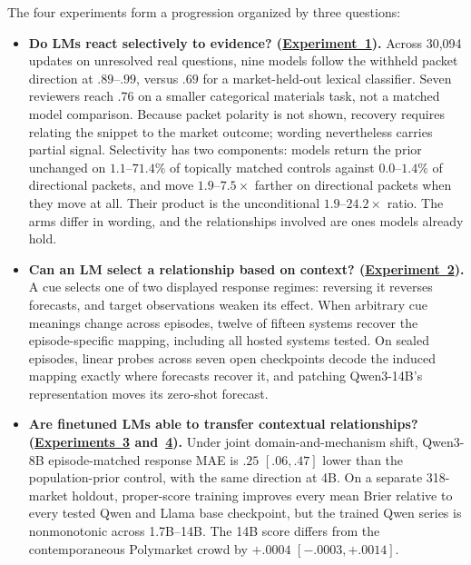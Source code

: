 The four experiments form a progression organized by three questions:
\begin{itemize}[nosep,leftmargin=*]
  \item \textbf{Do LMs react selectively to evidence?
  (\hyperref[sec:exp1]{Experiment~1}).}
  Across 30,094 updates on unresolved real questions, nine models follow the
  withheld packet direction at $.89$--$.99$, versus $.69$ for a market-held-out
  lexical classifier. Seven reviewers reach $.76$ on a smaller categorical
  materials task, not a matched model comparison. Because packet polarity is not
  shown, recovery requires relating the snippet to the market outcome; wording
  nevertheless carries partial signal. Selectivity has two components:
  models return
  the prior unchanged on $1.1$--$71.4\%$ of topically matched controls against
  $0.0$--$1.4\%$ of directional packets, and move $1.9$--$7.5\times$ farther on
  directional packets when they move at all. Their product is the unconditional
  $1.9$--$24.2\times$ ratio. The arms differ in wording, and the relationships
  involved are ones models already hold.
  \item \textbf{Can an LM select a relationship based on context?
  (\hyperref[sec:exp2]{Experiment~2}).}
  A cue selects one of two displayed response regimes: reversing it reverses
  forecasts, and target observations weaken its effect. When arbitrary cue meanings
  change across episodes, twelve of fifteen systems recover the episode-specific
  mapping, including all hosted systems tested. On sealed episodes, linear probes
  across seven open checkpoints decode the induced mapping exactly where forecasts
  recover it, and patching Qwen3-14B's representation moves its zero-shot forecast.
  \item \textbf{Are finetuned LMs able to transfer contextual relationships?
  (\hyperref[sec:exp3]{Experiments~3} and~\hyperref[sec:exp4]{4}).}
  Under joint domain-and-mechanism shift, Qwen3-8B episode-matched response MAE is
  $.25$ $[.06,.47]$ lower than the population-prior control, with the same direction
  at 4B. On a separate 318-market holdout, proper-score training improves every
  mean Brier relative to every tested Qwen and Llama base checkpoint, but the
  trained Qwen series is nonmonotonic
  across 1.7B--14B. The 14B score differs from the contemporaneous Polymarket crowd
  by $+.0004$ $[-.0003,+.0014]$.
\end{itemize}

